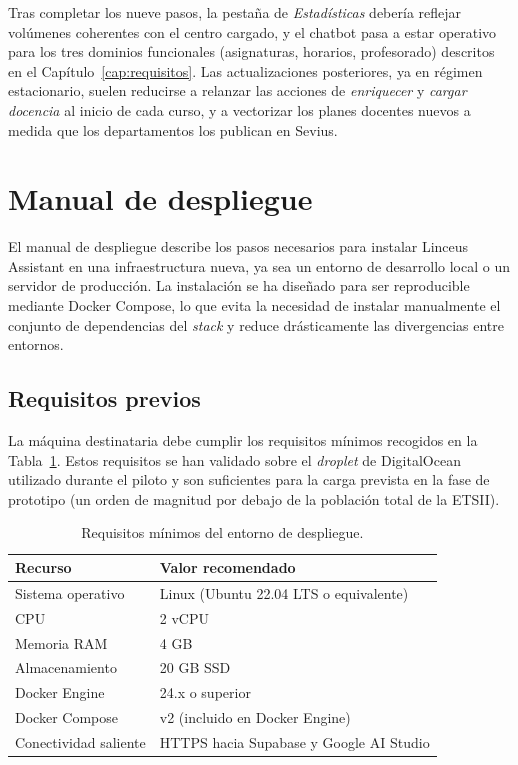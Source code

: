 Tras completar los nueve pasos, la pestaña de \textit{Estadísticas} debería reflejar volúmenes coherentes con el centro cargado, y el chatbot pasa a estar operativo para los tres dominios funcionales (asignaturas, horarios, profesorado) descritos en el Capítulo~\ref{cap:requisitos}. Las actualizaciones posteriores, ya en régimen estacionario, suelen reducirse a relanzar las acciones de \textit{enriquecer} y \textit{cargar docencia} al inicio de cada curso, y a vectorizar los planes docentes nuevos a medida que los departamentos los publican en Sevius.

\section{Manual de despliegue}\label{sec:manual-despliegue}

El manual de despliegue describe los pasos necesarios para instalar Linceus Assistant en una infraestructura nueva, ya sea un entorno de desarrollo local o un servidor de producción. La instalación se ha diseñado para ser reproducible mediante Docker Compose, lo que evita la necesidad de instalar manualmente el conjunto de dependencias del \textit{stack} y reduce drásticamente las divergencias entre entornos.

\subsection{Requisitos previos}\label{subsec:despliegue-requisitos}

La máquina destinataria debe cumplir los requisitos mínimos recogidos en la Tabla~\ref{tab:despliegue-requisitos}. Estos requisitos se han validado sobre el \textit{droplet} de DigitalOcean utilizado durante el piloto y son suficientes para la carga prevista en la fase de prototipo (un orden de magnitud por debajo de la población total de la ETSII).

\begin{table}[hbtp]
\centering
\caption{Requisitos mínimos del entorno de despliegue.}\label{tab:despliegue-requisitos}
\begin{tabular}{ll}
\hline
\textbf{Recurso} & \textbf{Valor recomendado} \\
\hline
Sistema operativo & Linux (Ubuntu 22.04 LTS o equivalente) \\
CPU & 2 vCPU \\
Memoria RAM & 4 GB \\
Almacenamiento & 20 GB SSD \\
Docker Engine & 24.x o superior \\
Docker Compose & v2 (incluido en Docker Engine) \\
Conectividad saliente & HTTPS hacia Supabase y Google AI Studio \\
\hline
\end{tabular}
\end{table}

